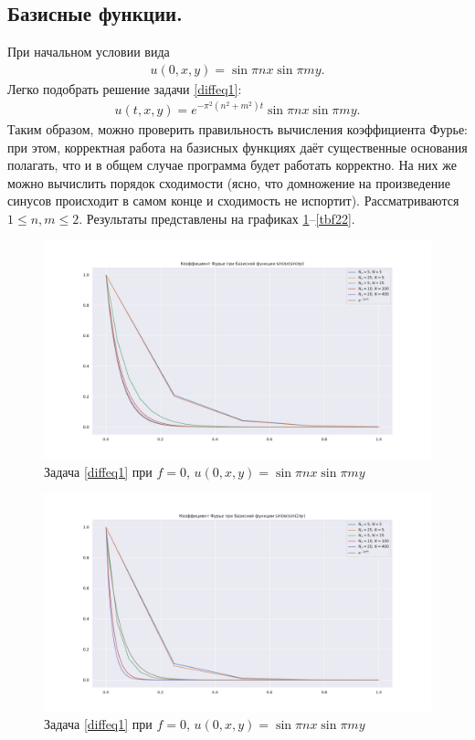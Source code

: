 \documentclass[14pt,a4paper]{extarticle}
\newcommand{\1}{\mathbbm{1}}
\begin{document}
\subsection{Базисные функции.}
При начальном условии вида
  \begin{align*}
     u(0, x, y) = \sin \pi n x \sin \pi m y.
 \end{align*}
 Легко подобрать решение задачи \ref{diffeq1}:
  \begin{align*}
     u(t, x, y) = e^{-\pi^2 (n^2 + m^2)t} \sin \pi n x \sin \pi m y.
 \end{align*}
 Таким образом, можно проверить правильность вычисления коэффициента Фурье: при этом, корректная работа на базисных функциях даёт существенные основания полагать, 
 что и в общем случае программа будет работать корректно. На них же можно вычислить порядок сходимости 
 (ясно, что домножение на произведение синусов происходит в самом конце и сходимость не испортит). Рассматриваются $1 \leq n, m \leq 2$. Результаты представлены 
 на графиках \ref{tbf11}--\ref{tbf22}.
 \begin{figure}
    \centering
    \includegraphics[scale=0.4]{figs/11bf_test.pdf}
    \caption{Задача \ref{diffeq1} при $f = 0$, $u(0, x, y) = \sin \pi n x \sin \pi m y$ }
    \label{tbf11}
\end{figure}
\begin{figure}
    \centering
    \includegraphics[scale=0.4]{figs/12bf_test.pdf}
    \caption{Задача \ref{diffeq1} при $f = 0$, $u(0, x, y) = \sin \pi n x \sin \pi m y$}
    \label{tbf12}
\end{figure}
\end{document}
